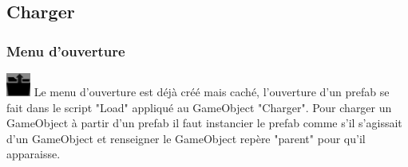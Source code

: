 \documentclass[a4paper,11pt]{article}
\begin{document}
	\subsection{Charger}
		\subsubsection{Menu d'ouverture}
			\includegraphics[scale=1]{./images/load.png} Le menu d'ouverture est déjà créé mais caché, l'ouverture d'un prefab se fait dans le script "Load" appliqué au GameObject "Charger". Pour charger un GameObject  à partir d'un prefab il faut instancier le prefab comme s'il s'agissait d'un GameObject et renseigner le GameObject repère "parent" pour qu'il apparaisse.
\end{document}
